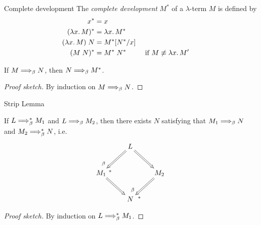 \begin{frame}{Complete development}
  The \emph{complete development} $M^*$ of a $\lambda$-term $M$ is defined by
  \begin{align*}
    x^*      & = x \\
    (\lambda x.\, M)^* & = \lambda x.\, M^* \\
    (\lambda x.\, M)\;N & = M^*[{N^*}/{x}] \\
    (M\;N)^* & = M^*\;N^* && \text{ if $M \not\equiv \lambda x.\,M'$ } 
  \end{align*}
  \begin{theorem}
    If $M \Longrightarrow_{\beta} N$, then $N \Longrightarrow_{\beta} M^*$.
  \end{theorem}
  \begin{proof}[Proof sketch]
    By induction on $M \Longrightarrow_{\beta} N$.
    
  \end{proof}
\end{frame}

\begin{frame}{Strip Lemma}
  \begin{theorem}
    If $L \Longrightarrow_{\beta}^* M_1$ and $L \Longrightarrow_{\beta} M_2$, then there exists $N$
    satisfying that $M_1 \Longrightarrow_{\beta} N$ and $M_2 \Longrightarrow_{\beta}^* N$, i.e.\
    \[
      \xymatrix{
        & L \ar@{=>}[rd] \ar@{=>}[ld]^(.8){*}_(.8){\beta} \\
        M_1 \ar@{=>}[rd] & & M_2 \ar@{=>}[ld]^(.8){*}_(.8){\beta} \\
            & N
      }
    \]
  \end{theorem}
  \begin{proof}[Proof sketch]
    By induction on $L \Longrightarrow_{\beta}^* M_1$. 
  \end{proof}
\end{frame}

